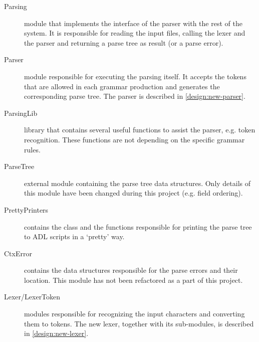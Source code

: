   \begin{description}
    \item[Parsing] module that implements the interface of the parser with the rest of the system.
      It is responsible for reading the input files, calling the lexer and the parser and returning a parse tree as result (or a parse error).

    \item[Parser] module responsible for executing the parsing itself.
      It accepts the tokens that are allowed in each grammar production and generates the corresponding parse tree.
      The parser is described in \autoref{design:new-parser}.
      
    \item[ParsingLib] library that contains several useful functions to assist the parser, e.g. token recognition.
      These functions are not depending on the specific grammar rules.
      
    \item[ParseTree] external module containing the parse tree data structures.
      Only details of this module have been changed during this project (e.g. field ordering).
    
    \item[PrettyPrinters] contains the  class and the functions responsible for printing the parse tree to ADL scripts in a `pretty' way.
    
    \item[CtxError] contains the data structures responsible for the parse errors and their location.
      This module has not been refactored as a part of this project.
    
    \item[Lexer/LexerToken] modules responsible for recognizing the input characters and converting them to tokens.
      The new lexer, together with its sub-modules, is described in \autoref{design:new-lexer}.
  \end{description}
